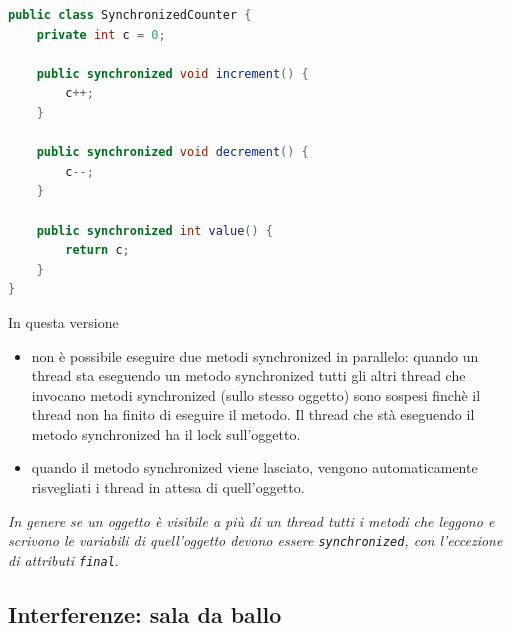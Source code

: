 \documentclass{article}
\begin{document}
\begin{lstlisting}[language=Java]
public class SynchronizedCounter {
    private int c = 0;

    public synchronized void increment() {
        c++;
    }

    public synchronized void decrement() {
        c--;
    }

    public synchronized int value() {
        return c;
    }
}
\end{lstlisting}
In questa versione 
\begin{itemize}
\item non \`e possibile eseguire due metodi synchronized in parallelo: quando un thread sta eseguendo un metodo synchronized tutti gli altri thread che invocano metodi synchronized (sullo stesso oggetto) sono sospesi finch\`e il thread non ha finito di eseguire il  metodo. Il thread che st\`a eseguendo il metodo synchronized ha il lock sull'oggetto.
\item quando il metodo synchronized viene lasciato, vengono automaticamente risvegliati i thread in attesa di quell'oggetto. 
\end{itemize}
\emph{In genere se un oggetto \`e visibile a pi\`u di un thread tutti i metodi che leggono e scrivono le variabili di quell'oggetto devono essere \texttt{synchronized}, con l'eccezione di attributi \texttt{final}}.




\subsection{Interferenze: sala da ballo}
\end{document}
